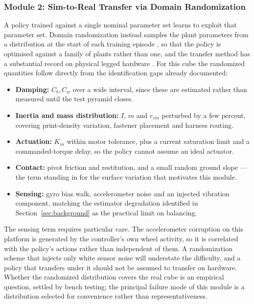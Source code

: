 \subsubsection{Module 2: Sim-to-Real Transfer via Domain Randomization}

A policy trained against a single nominal parameter set learns to exploit that
parameter set. Domain randomization instead samples the plant parameters from
a distribution at the start of each training episode
\cite{tobin2017domainrand}, so that the policy is optimised against a family
of plants rather than one, and the transfer method has a substantial record on
physical legged hardware \cite{hwangbo2019anymal}. For this cube the
randomized quantities follow directly from the identification gaps already
documented:

\begin{itemize}
    \item \textbf{Damping:} $C_b, C_w$ over a wide interval, since these are
    estimated rather than measured until the test pyramid closes. %
    \item \textbf{Inertia and mass distribution:} $I$, $m$ and $r_{cm}$
    perturbed by a few percent, covering print-density variation, fastener
    placement and harness routing.
    \item \textbf{Actuation:} $K_m$ within motor tolerance, plus a current
    saturation limit and a commanded-torque delay, so the policy cannot assume
    an ideal actuator.
    \item \textbf{Contact:} pivot friction and restitution, and a small random
    ground slope --- the term standing in for the surface variation that
    motivates this module.
    \item \textbf{Sensing:} gyro bias walk, accelerometer noise and an
    injected vibration component, matching the estimator degradation
    identified in Section~\ref{sec:background} as the practical limit on
    balancing.
\end{itemize}

The sensing term requires particular care. The accelerometer corruption on this
platform is generated by the controller's own wheel activity, so it is
correlated with the policy's actions rather than independent of them. A
randomization scheme that injects only white sensor noise will understate the
difficulty, and a policy that transfers under it should not be assumed to
transfer on hardware. Whether the randomized distribution covers the real cube
is an empirical question, settled by bench testing; the principal failure mode
of this module is a distribution selected for convenience rather than
representativeness.

